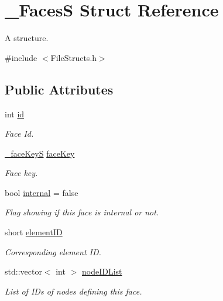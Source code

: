 \hypertarget{struct___faces_s}{}\section{\+\_\+\+FacesS Struct Reference}
\label{struct___faces_s}


A structure.  




{\ttfamily \#include $<$File\+Structs.\+h$>$}

\subsection*{Public Attributes}
\begin{DoxyCompactItemize}
\item 
int \hyperlink{struct___faces_s_a7365ff5c5951b2a61ef5e4411b0d521a}{id}
\begin{DoxyCompactList}\small\item\em Face Id. \end{DoxyCompactList}\item 
\hyperlink{struct__face_key_s}{\+\_\+face\+KeyS} \hyperlink{struct___faces_s_a0b72e5930902a49f376d035d654ecef8}{face\+Key}
\begin{DoxyCompactList}\small\item\em Face key. \end{DoxyCompactList}\item 
bool \hyperlink{struct___faces_s_a5ce239e336aea528dad6008a6f2909f0}{internal} = false
\begin{DoxyCompactList}\small\item\em Flag showing if this face is internal or not. \end{DoxyCompactList}\item 
short \hyperlink{struct___faces_s_a430ed7b14ef236bea40b0a9be2801c94}{element\+ID}
\begin{DoxyCompactList}\small\item\em Corresponding element ID. \end{DoxyCompactList}\item 
std\+::vector$<$ int $>$ \hyperlink{struct___faces_s_a1af35bd658b7be0f98e09deb5f8b3ead}{node\+I\+D\+List}
\begin{DoxyCompactList}\small\item\em List of I\+Ds of nodes defining this face. \end{DoxyCompactList}\end{DoxyCompactItemize}


